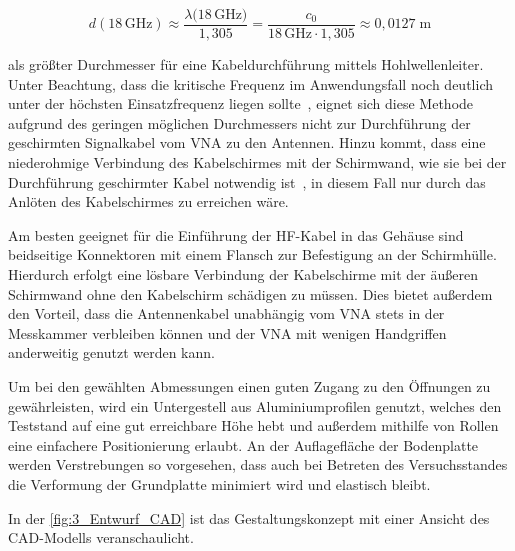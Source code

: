 \begin{equation}
    d(18\,\si{\giga\hertz}) \approx \frac{\lambda(18\,\si{\giga\hertz)}}{1,305} = \frac{c_0}{18\,\si{\giga\hertz}\cdot 1,305} \approx 0,0127 \; \si{\meter}
\end{equation}

als größter Durchmesser für eine Kabeldurchführung mittels Hohlwellenleiter. Unter Beachtung, dass die kritische Frequenz im Anwendungsfall noch deutlich unter der höchsten Einsatzfrequenz liegen sollte~\cite{EM_Schirmung}, eignet sich diese Methode aufgrund des geringen möglichen Durchmessers nicht zur Durchführung der geschirmten Signalkabel vom \ac{VNA} zu den Antennen. Hinzu kommt, dass eine niederohmige Verbindung des Kabelschirmes mit der Schirmwand, wie sie bei der Durchführung geschirmter Kabel notwendig ist~\cite{EM_Schirmung, EMV}, in diesem Fall nur durch das Anlöten des Kabelschirmes zu erreichen wäre.
\par
\vspace{\linespace}
Am besten geeignet für die Einführung der HF-Kabel in das Gehäuse sind beidseitige Konnektoren mit einem Flansch zur Befestigung an der Schirmhülle. Hierdurch erfolgt eine lösbare Verbindung der Kabelschirme mit der äußeren Schirmwand ohne den Kabelschirm schädigen zu müssen. Dies bietet außerdem den Vorteil, dass die Antennenkabel unabhängig vom \ac{VNA} stets in der Messkammer verbleiben können und der \ac{VNA} mit wenigen Handgriffen anderweitig genutzt werden kann. 
\par
\vspace{\linespace}
Um bei den gewählten Abmessungen einen guten Zugang zu den Öffnungen zu gewährleisten, wird ein Untergestell aus Aluminiumprofilen genutzt, welches den Teststand auf eine gut erreichbare Höhe hebt und außerdem mithilfe von Rollen eine einfachere Positionierung erlaubt. An der Auflagefläche der Bodenplatte werden Verstrebungen so vorgesehen, dass auch bei Betreten des Versuchsstandes die Verformung der Grundplatte minimiert wird und elastisch bleibt.
\par
\vspace{\linespace}
In der \Abb\ref{fig:3_Entwurf_CAD} ist das Gestaltungskonzept mit einer Ansicht des CAD-Modells veranschaulicht. 
\par
\vspace{\linespace}\vspace{\linespace}


